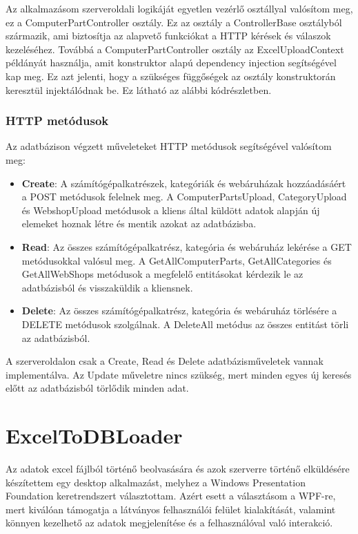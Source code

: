 \documentclass[
]{thesis-ekf}
\theoremstyle{definition}
\theoremstyle{remark}
\begin{document}
Az alkalmazásom szerveroldali logikáját egyetlen vezérlő osztállyal valósítom meg, ez a ComputerPartController osztály. Ez az osztály a ControllerBase osztályból származik, ami biztosítja az alapvető funkciókat a HTTP kérések és válaszok kezeléséhez. Továbbá a ComputerPartController osztály az ExcelUploadContext példányát használja, amit konstruktor alapú dependency injection segítségével kap meg. Ez azt jelenti, hogy a szükséges függőségek az osztály konstruktorán keresztül injektálódnak be. Ez látható az alábbi kódrészletben.


\subsubsection{HTTP metódusok}
Az adatbázison végzett műveleteket HTTP metódusok segítségével valósítom meg:
\begin{itemize}
	\item \textbf{Create}: A számítógépalkatrészek, kategóriák és webáruházak hozzáadásáért a POST metódusok felelnek meg. A ComputerPartsUpload, CategoryUpload és WebshopUpload metódusok a kliens által küldött adatok alapján új elemeket hoznak létre és mentik azokat az adatbázisba.

	\item \textbf{Read}: Az összes számítógépalkatrész, kategória és webáruház lekérése a GET metódusokkal valósul meg. A GetAllComputerParts, GetAllCategories és GetAllWebShops metódusok a megfelelő entitásokat kérdezik le az adatbázisból és visszaküldik  a kliensnek.

	\item \textbf{Delete}: Az összes számítógépalkatrész, kategória és webáruház törlésére a DELETE metódusok szolgálnak. A DeleteAll metódus az összes entitást törli az adatbázisból.
\end{itemize}
A szerveroldalon csak a Create, Read és Delete adatbázisműveletek vannak implementálva. Az Update műveletre nincs szükség, mert minden egyes új keresés előtt az adatbázisból törlődik minden adat.



\section{ExcelToDBLoader}
Az adatok excel fájlból történő beolvasására és azok szerverre történő elküldésére készítettem egy desktop alkalmazást, melyhez a Windows Presentation Foundation keretrendszert választottam. Azért esett a választásom a WPF-re, mert kiválóan támogatja a látványos felhasználói felület kialakítását, valamint könnyen kezelhető az adatok megjelenítése és a felhasználóval való interakció. 
\end{document}
